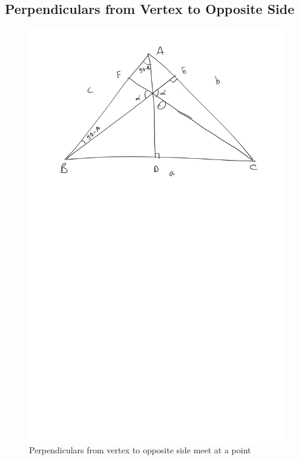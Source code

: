 \subsection{Perpendiculars from Vertex to Opposite Side}
	\begin{figure}[!h]
		\begin{center}
			
			\includegraphics[width=\columnwidth]{./figs/ch3_perp_triang}
			\vspace*{-10cm}
		\end{center}
		\caption{Perpendiculars from vertex to opposite side meet at a point}
		\label{ch3_perp_triang}	
	\end{figure}

